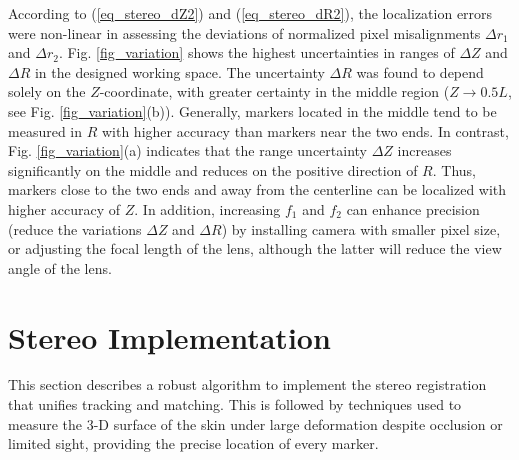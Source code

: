 \documentclass[10pt,letterpaper,journal,final,twoside,twocolumn,nofonttune]{IEEEtran}
\begin{document}
According to (\ref{eq_stereo_dZ2}) and (\ref{eq_stereo_dR2}), the localization errors were non-linear in assessing the deviations of normalized pixel misalignments $\Delta r_1$ and $\Delta r_2$. Fig. \ref{fig_variation} shows the highest uncertainties in ranges of $\Delta Z$ and $\Delta R$ in the designed working space. The uncertainty $\Delta R$ was found to depend solely on the $Z$-coordinate, with greater certainty in the middle region ($Z \rightarrow 0.5L$, see Fig. \ref{fig_variation}(b)). Generally, markers located in the middle tend to be measured in $R$ with higher accuracy than markers near the two ends. In contrast, Fig. \ref{fig_variation}(a) indicates that the range uncertainty $\Delta Z$ increases significantly on the middle and reduces on the positive direction of $R$. Thus, markers close to the two ends and away from the centerline can be localized with higher accuracy of $Z$. In addition, increasing $f_1$ and $f_2$ can enhance precision (reduce the variations $\Delta Z$ and $\Delta R$) by installing camera with smaller pixel size, or adjusting the focal length of the lens, although the latter will reduce the view angle of the lens. 
\section{Stereo Implementation}
This section describes a robust algorithm to implement the stereo registration that unifies tracking and matching. This is followed by techniques used to measure the 3-D surface of the skin under large deformation despite occlusion or limited sight, providing the precise location of every marker.
\end{document}
